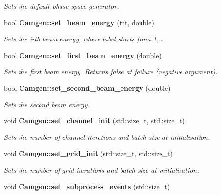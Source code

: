 \begin{DoxyCompactItemize}
\begin{DoxyCompactList}\small\item\em Sets the default phase space generator. \end{DoxyCompactList}\item 
\hypertarget{a00878_a3d9a5318e3d8e17cacfba879ab7c8291}{}bool {\bfseries Camgen\+::set\+\_\+beam\+\_\+energy} (int, double)\label{a00878_a3d9a5318e3d8e17cacfba879ab7c8291}

\begin{DoxyCompactList}\small\item\em Sets the i-\/th beam energy, where label starts from 1,... \end{DoxyCompactList}\item 
\hypertarget{a00878_ae2e0cea12c80a74f3bcbac43337e5e88}{}bool {\bfseries Camgen\+::set\+\_\+first\+\_\+beam\+\_\+energy} (double)\label{a00878_ae2e0cea12c80a74f3bcbac43337e5e88}

\begin{DoxyCompactList}\small\item\em Sets the first beam energy. Returns false at failure (negative argument). \end{DoxyCompactList}\item 
bool {\bfseries Camgen\+::set\+\_\+second\+\_\+beam\+\_\+energy} (double)
\begin{DoxyCompactList}\small\item\em Sets the second beam energy. \end{DoxyCompactList}\item 
\hypertarget{a00878_a53fa6d3e2329bf8296ae332aefd5da50}{}void {\bfseries Camgen\+::set\+\_\+channel\+\_\+init} (std\+::size\+\_\+t, std\+::size\+\_\+t)\label{a00878_a53fa6d3e2329bf8296ae332aefd5da50}

\begin{DoxyCompactList}\small\item\em Sets the number of channel iterations and batch size at initialisation. \end{DoxyCompactList}\item 
\hypertarget{a00878_aa1dfc99b70f13b45c913a0cb81e7d62c}{}void {\bfseries Camgen\+::set\+\_\+grid\+\_\+init} (std\+::size\+\_\+t, std\+::size\+\_\+t)\label{a00878_aa1dfc99b70f13b45c913a0cb81e7d62c}

\begin{DoxyCompactList}\small\item\em Sets the number of grid iterations and batch size at initialisation. \end{DoxyCompactList}\item 
\hypertarget{a00878_a19f0b77f8377b972be7709b95baeec3b}{}void {\bfseries Camgen\+::set\+\_\+subprocess\+\_\+events} (std\+::size\+\_\+t)\label{a00878_a19f0b77f8377b972be7709b95baeec3b}


\end{DoxyCompactItemize}
